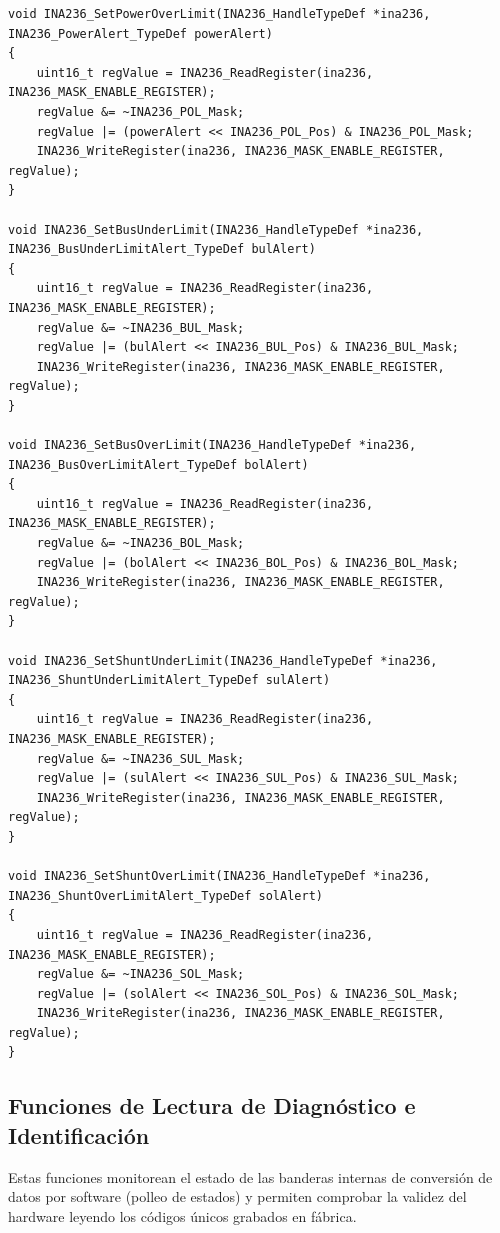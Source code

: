 \documentclass[
10pt, %
a4paper, %
oneside, %
headinclude,footinclude, %
BCOR5mm, %
]{scrartcl}
\begin{document}
\begin{lstlisting}[style=CMakeStyle]
void INA236_SetPowerOverLimit(INA236_HandleTypeDef *ina236, INA236_PowerAlert_TypeDef powerAlert)
{
    uint16_t regValue = INA236_ReadRegister(ina236, INA236_MASK_ENABLE_REGISTER);
    regValue &= ~INA236_POL_Mask;
    regValue |= (powerAlert << INA236_POL_Pos) & INA236_POL_Mask;
    INA236_WriteRegister(ina236, INA236_MASK_ENABLE_REGISTER, regValue);
}

void INA236_SetBusUnderLimit(INA236_HandleTypeDef *ina236, INA236_BusUnderLimitAlert_TypeDef bulAlert)
{
    uint16_t regValue = INA236_ReadRegister(ina236, INA236_MASK_ENABLE_REGISTER);
    regValue &= ~INA236_BUL_Mask;
    regValue |= (bulAlert << INA236_BUL_Pos) & INA236_BUL_Mask;
    INA236_WriteRegister(ina236, INA236_MASK_ENABLE_REGISTER, regValue);
}

void INA236_SetBusOverLimit(INA236_HandleTypeDef *ina236, INA236_BusOverLimitAlert_TypeDef bolAlert)
{
    uint16_t regValue = INA236_ReadRegister(ina236, INA236_MASK_ENABLE_REGISTER);
    regValue &= ~INA236_BOL_Mask;
    regValue |= (bolAlert << INA236_BOL_Pos) & INA236_BOL_Mask;
    INA236_WriteRegister(ina236, INA236_MASK_ENABLE_REGISTER, regValue);
}

void INA236_SetShuntUnderLimit(INA236_HandleTypeDef *ina236, INA236_ShuntUnderLimitAlert_TypeDef sulAlert)
{
    uint16_t regValue = INA236_ReadRegister(ina236, INA236_MASK_ENABLE_REGISTER);
    regValue &= ~INA236_SUL_Mask;
    regValue |= (sulAlert << INA236_SUL_Pos) & INA236_SUL_Mask;
    INA236_WriteRegister(ina236, INA236_MASK_ENABLE_REGISTER, regValue);
}

void INA236_SetShuntOverLimit(INA236_HandleTypeDef *ina236, INA236_ShuntOverLimitAlert_TypeDef solAlert)
{
    uint16_t regValue = INA236_ReadRegister(ina236, INA236_MASK_ENABLE_REGISTER);
    regValue &= ~INA236_SOL_Mask;
    regValue |= (solAlert << INA236_SOL_Pos) & INA236_SOL_Mask;
    INA236_WriteRegister(ina236, INA236_MASK_ENABLE_REGISTER, regValue);
}
\end{lstlisting}

\subsection{Funciones de Lectura de Diagnóstico e Identificación}
Estas funciones monitorean el estado de las banderas internas de conversión de datos por software (polleo de estados) y permiten comprobar la validez del hardware leyendo los códigos únicos grabados en fábrica.
\end{document}
